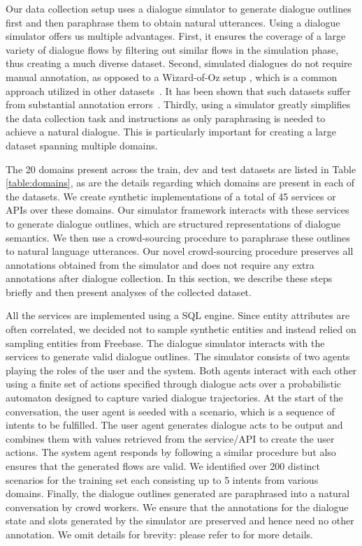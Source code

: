Our data collection setup uses a dialogue simulator to generate dialogue outlines first and then paraphrase them to obtain natural utterances. Using a dialogue simulator offers us multiple advantages. First, it ensures the coverage of a large variety of dialogue flows by filtering out similar flows in the simulation phase, thus creating a much diverse dataset. 
Second, simulated dialogues do not require manual annotation, as opposed to a Wizard-of-Oz setup \cite{kelley1984iterative}, which is a common approach utilized in other datasets~\cite{budzianowski2018multiwoz}. It has been shown that such datasets suffer from substantial annotation errors~\cite{eric2019multiwoz}. Thirdly, using a simulator greatly simplifies the data collection task and instructions as only paraphrasing is needed to achieve a natural dialogue. This is particularly important for creating a large dataset spanning multiple domains.

The 20 domains present across the train, dev and test datasets are listed in Table \ref{table:domains}, as are the details regarding which domains are present in each of the datasets. We create synthetic implementations of a total of 45 services or APIs over these domains. Our simulator framework interacts with these services to generate dialogue outlines, which are structured representations of dialogue semantics. We then use a crowd-sourcing procedure to paraphrase these outlines to natural language utterances. Our novel crowd-sourcing procedure preserves all annotations obtained from the simulator and does not require any extra annotations after dialogue collection. In this section, we describe these steps briefly and then present analyses of the collected dataset. 

All the services are implemented using a SQL engine. Since entity attributes are often correlated, we decided not to sample synthetic entities and instead relied on sampling entities from Freebase. The dialogue simulator interacts with the services to generate valid dialogue outlines. The simulator consists of two agents  playing  the  roles  of  the  user  and  the  system.  Both agents interact with each other using a finite set of actions specified through dialogue acts over a probabilistic automaton designed to capture varied dialogue trajectories. At the start of the conversation, the user agent is seeded with a scenario, which is a sequence of intents to be fulfilled. The user agent generates dialogue acts to be output and combines them with values retrieved from the service/API to create the user actions. The system agent responds by following a similar procedure but also ensures that the generated flows are valid.  We identified over 200 distinct scenarios for the training set each consisting up to 5 intents from various domains. Finally, the dialogue outlines generated are paraphrased into a natural conversation by crowd workers. We ensure that the annotations for the dialogue state and slots generated by the simulator are preserved and hence need no other annotation. We omit details for brevity: please refer to \citet{rastogi2019towards} for more details.

